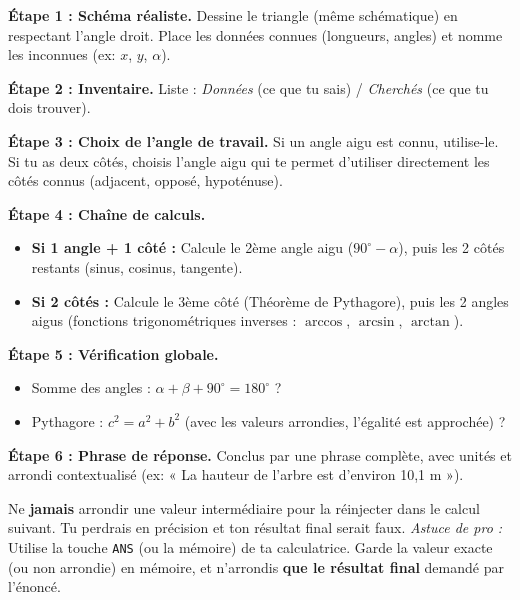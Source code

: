 \documentclass[11pt]{article}
\begin{document}
\begin{methode}
\textbf{Étape 1 : Schéma réaliste.} Dessine le triangle (même schématique) en respectant l'angle droit. Place les données connues (longueurs, angles) et nomme les inconnues (ex: $x$, $y$, $\alpha$).

\textbf{Étape 2 : Inventaire.} Liste : \textit{Données} (ce que tu sais) / \textit{Cherchés} (ce que tu dois trouver).

\textbf{Étape 3 : Choix de l'angle de travail.} Si un angle aigu est connu, utilise-le. Si tu as deux côtés, choisis l'angle aigu qui te permet d'utiliser directement les côtés connus (adjacent, opposé, hypoténuse).

\textbf{Étape 4 : Chaîne de calculs.}
\begin{itemize}
    \item \textbf{Si 1 angle + 1 côté :} Calcule le 2ème angle aigu ($90^\circ - \alpha$), puis les 2 côtés restants (sinus, cosinus, tangente).
    \item \textbf{Si 2 côtés :} Calcule le 3ème côté (Théorème de Pythagore), puis les 2 angles aigus (fonctions trigonométriques inverses : $\arccos$, $\arcsin$, $\arctan$).
\end{itemize}

\textbf{Étape 5 : Vérification globale.}
\begin{itemize}
    \item Somme des angles : $\alpha + \beta + 90^\circ = 180^\circ$ ?
    \item Pythagore : $c^2 = a^2 + b^2$ (avec les valeurs arrondies, l'égalité est approchée) ?
\end{itemize}

\textbf{Étape 6 : Phrase de réponse.} Conclus par une phrase complète, avec unités et arrondi contextualisé (ex: « La hauteur de l'arbre est d'environ 10,1 m »).
\end{methode}

\begin{attention}
Ne \textbf{jamais} arrondir une valeur intermédiaire pour la réinjecter dans le calcul suivant. Tu perdrais en précision et ton résultat final serait faux.
\emph{Astuce de pro :} Utilise la touche \texttt{ANS} (ou la mémoire) de ta calculatrice. Garde la valeur exacte (ou non arrondie) en mémoire, et n'arrondis \textbf{que le résultat final} demandé par l'énoncé.
\end{attention}
\end{document}
